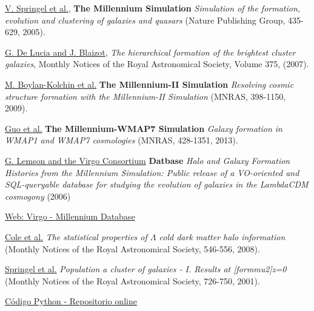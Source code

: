 \begin{thebibliography}{9}
\href{https://ui.adsabs.harvard.edu/abs/2005Natur.435..629S/abstract}{V. Springel et al.},
\textbf{The Millennium Simulation}
\textit{Simulation of the formation, evolution and clustering of galaxies and quasars}
(Nature Publishing Group, 435-629, 2005).

\href{https://ui.adsabs.harvard.edu/abs/2007MNRAS.375....2D/abstract}{G. De Lucia and J. Blaizot},
\textit{The hierarchical formation of the brightest cluster galaxies},
Monthly Notices of the Royal Astronomical Society, Volume 375, (2007).

\href{https://ui.adsabs.harvard.edu/abs/2009MNRAS.398.1150B/abstract}{M. Boylan-Kolchin et al.} 
\textbf{The Millennium-II Simulation}
\textit{Resolving cosmic structure formation with the Millennium-II Simulation}
(MNRAS, 398-1150, 2009).

\href{https://ui.adsabs.harvard.edu/abs/2013MNRAS.428.1351G/abstract}{Guo et al.} 
\textbf{The Millennium-WMAP7 Simulation}
\textit{Galaxy formation in WMAP1 and WMAP7 cosmologies}
(MNRAS, 428-1351, 2013).

\href{https://ui.adsabs.harvard.edu/abs/2006astro.ph..8019L/abstract}{G. Lemson and the Virgo Consortium} 
\textbf{Datbase}
\textit{Halo and Galaxy Formation Histories from the Millennium Simulation: Public release of a VO-oriented and SQL-queryable database for studying the evolution of galaxies in the LambdaCDM cosmogony}
(2006)

\href{http://gavo.mpa-garching.mpg.de/Millennium/}{Web: Virgo - Millennium Database}

\href{https://ui.adsabs.harvard.edu/abs/2008MNRAS.383..546C/abstract}{Cole et al.} 
\textit{The statistical properties of $\Lambda$ cold dark matter halo information}
(Monthly Notices of the Royal Astronomical Society, 546-556, 2008).

\href{https://ui.adsabs.harvard.edu/abs/2001MNRAS.328..726S/abstract}{Springel et al.} 
\textit{Population a cluster of galaxies - I. Results at [formmu2]z=0}
(Monthly Notices of the Royal Astronomical Society, 726-750, 2001).

\href{https://github.com/Labalor/MillenniumSimulation/}{Código Python - Repositorio online}

\end{thebibliography}

